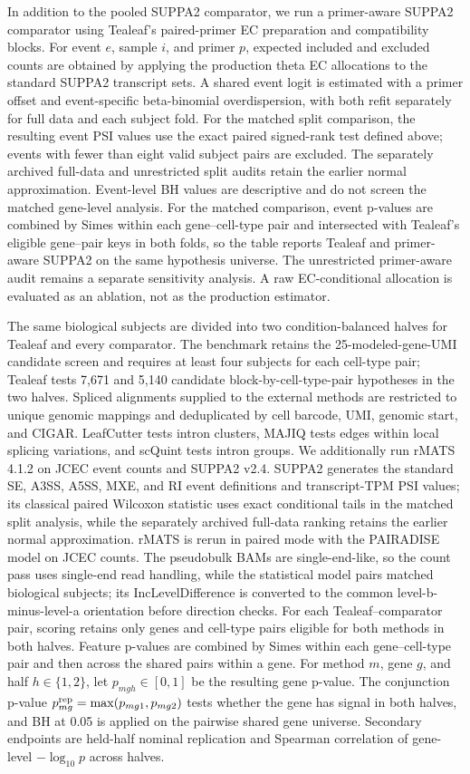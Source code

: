 \documentclass[11pt]{article}
\begin{document}
In addition to the pooled SUPPA2 comparator, we run a primer-aware SUPPA2 comparator using Tealeaf's paired-primer EC preparation and compatibility blocks. For event \(e\), sample \(i\), and primer \(p\), expected included and excluded counts are obtained by applying the production theta EC allocations to the standard SUPPA2 transcript sets. A shared event logit is estimated with a primer offset and event-specific beta-binomial overdispersion, with both refit separately for full data and each subject fold. For the matched split comparison, the resulting event PSI values use the exact paired signed-rank test defined above; events with fewer than eight valid subject pairs are excluded. The separately archived full-data and unrestricted split audits retain the earlier normal approximation. Event-level BH values are descriptive and do not screen the matched gene-level analysis. For the matched comparison, event p-values are combined by Simes within each gene--cell-type pair and intersected with Tealeaf's eligible gene--pair keys in both folds, so the table reports Tealeaf and primer-aware SUPPA2 on the same hypothesis universe. The unrestricted primer-aware audit remains a separate sensitivity analysis. A raw EC-conditional allocation is evaluated as an ablation, not as the production estimator.

The same biological subjects are divided into two condition-balanced halves for Tealeaf and every comparator. The benchmark retains the 25-modeled-gene-UMI candidate screen and requires at least four subjects for each cell-type pair; Tealeaf tests 7,671 and 5,140 candidate block-by-cell-type-pair hypotheses in the two halves. Spliced alignments supplied to the external methods are restricted to unique genomic mappings and deduplicated by cell barcode, UMI, genomic start, and CIGAR. LeafCutter tests intron clusters, MAJIQ tests edges within local splicing variations, and scQuint tests intron groups. We additionally run rMATS 4.1.2 on JCEC event counts and SUPPA2 v2.4. SUPPA2 generates the standard SE, A3SS, A5SS, MXE, and RI event definitions and transcript-TPM PSI values; its classical paired Wilcoxon statistic uses exact conditional tails in the matched split analysis, while the separately archived full-data ranking retains the earlier normal approximation. rMATS is rerun in paired mode with the PAIRADISE model on JCEC counts. The pseudobulk BAMs are single-end-like, so the count pass uses single-end read handling, while the statistical model pairs matched biological subjects; its IncLevelDifference is converted to the common level-b-minus-level-a orientation before direction checks. For each Tealeaf--comparator pair, scoring retains only genes and cell-type pairs eligible for both methods in both halves. Feature p-values are combined by Simes within each gene--cell-type pair and then across the shared pairs within a gene. For method \(m\), gene \(g\), and half \(h\in\{1,2\}\), let \(p_{mgh}\in[0,1]\) be the resulting gene p-value. The conjunction p-value \(p_{mg}^{\rm rep}=\max(p_{mg1},p_{mg2})\) tests whether the gene has signal in both halves, and BH at 0.05 is applied on the pairwise shared gene universe. Secondary endpoints are held-half nominal replication and Spearman correlation of gene-level \(-\log_{10}p\) across halves.
\end{document}
